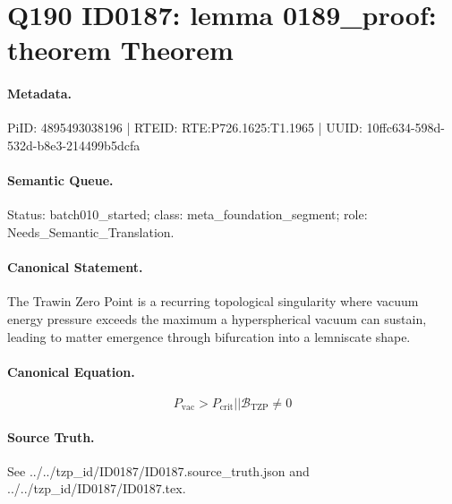 \section*{Q190 ID0187: lemma 0189\_proof: theorem Theorem}
\paragraph{Metadata.}
PiID: 4895493038196 | RTEID: RTE:P726.1625:T1.1965 | UUID: 10ffc634-598d-532d-b8e3-214499b5dcfa

\paragraph{Semantic Queue.}
Status: batch010\_started; class: meta\_foundation\_segment; role: Needs\_Semantic\_Translation.

\paragraph{Canonical Statement.}
The Trawin Zero Point is a recurring topological singularity where vacuum energy pressure exceeds the maximum a hyperspherical vacuum can sustain, leading to matter emergence through bifurcation into a lemniscate shape.

\paragraph{Canonical Equation.}
\[
P_{\mathrm{vac}} > P_{\mathrm{crit}} || \mathcal{B}_{\mathrm{TZP}} \neq 0
\]

\paragraph{Source Truth.}
See ../../tzp\_id/ID0187/ID0187.source\_truth.json and ../../tzp\_id/ID0187/ID0187.tex.
